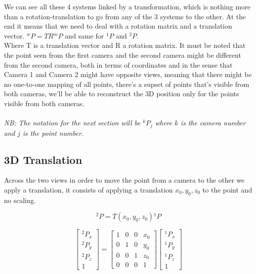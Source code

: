 We can see all these 4 systems linked by a transformation, which is nothing more than a rotation-translation to go from any of the 3 systems to the other. At the end it means that we need to deal with a rotation matrix and a translation vector.
\({}^wP = T R {}^mP\) and same for \({}^1P\) and \({}^2P\).
\\Where T is a translation vector and R a rotation matrix. It must be noted that the point seen from the first camera and the second camera might be different from the second camera, both in terms of coordinates and in the sense that Camera 1 and Camera 2 might have opposite views, meaning that there might be no one-to-one mapping of all points, there's a supset of points that's visible from both cameras, we'll be able to reconstruct the 3D position only for the points visible from both cameras.
\\\\\textit{NB: The notation for the next section will be \({}^kP_j\) where \(k\) is the camera number and \(j\) is the point number.}

\subsection{3D Translation}

Across the two views in order to move the point from a camera to the other we apply a translation,
it consists of applying a translation \(x_0, y_0, z_0\) to the point and no scaling.

\[
    {}^2P = T(x_0, y_0, z_0) {}^1P 
\]

\[
    \begin{bmatrix}
        {}^2P_x \\
        {}^2P_y \\
        {}^2P_z \\
        1
    \end{bmatrix}
    =
    \begin{bmatrix}
        1 & 0 & 0 & x_0 \\
        0 & 1 & 0 & y_0 \\
        0 & 0 & 1 & z_0 \\
        0 & 0 & 0 & 1
    \end{bmatrix}
    \begin{bmatrix}
        {}^1P_x \\
        {}^1P_y \\
        {}^1P_z \\
        1
    \end{bmatrix}   
\]


